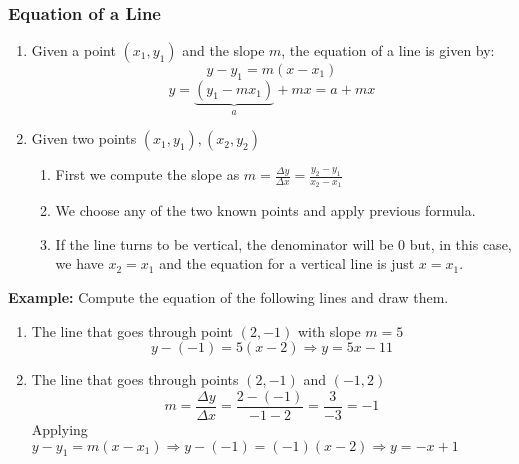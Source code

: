 \documentclass[11pt]{article}
\providecommand{\tightlist}{%
      \setlength{\itemsep}{0pt}\setlength{\parskip}{0pt}}
\begin{document}
    \begin{center}
    \end{center}
    { \hspace*{\fill} \\}
    
    \hypertarget{equation-of-a-line}{%
\subsubsection{Equation of a Line}\label{equation-of-a-line}}

\begin{enumerate}
\def\labelenumi{\arabic{enumi}.}
\item
  Given a point \((x_1, y_1)\) and the slope \(m\), the equation of a
  line is given by: \[
  y - y_1 = m(x - x_1)
  \] \[
  y = \underset{a}{\underbrace{(y_1 - m x_1)}} + m x = a + mx
  \]
\item
  Given two points \((x_1,y_1),(x_2, y_2)\)

  \begin{enumerate}
  \def\labelenumii{\arabic{enumii}.}
  \tightlist
  \item
    First we compute the slope as
    \(m = \frac{\Delta y}{\Delta x} = \frac{y_2 - y_1}{x_2 - x_1}\)
  \item
    We choose any of the two known points and apply previous formula.
  \item
    If the line turns to be vertical, the denominator will be \(0\) but,
    in this case, we have \(x_2 = x_1\) and the equation for a vertical
    line is just \(x = x_1\).
  \end{enumerate}
\end{enumerate}

\textbf{Example:} Compute the equation of the following lines and draw
them.

\begin{enumerate}
\def\labelenumi{\arabic{enumi}.}
\tightlist
\item
  The line that goes through point \((2, -1)\) with slope \(m = 5\) \[
  y - (-1) = 5(x - 2) \Rightarrow y = 5x - 11
  \]
\item
  The line that goes through points \((2, -1)\) and \((-1,2)\) \[
  m = \frac{\Delta y}{\Delta x} = \frac{2-(-1)}{-1-2} = \frac{3}{-3} = -1 
  \] Applying
  \(y - y_1 = m(x - x_1) \Rightarrow y-(-1) = (-1)(x-2) \Rightarrow y = -x + 1\)
\end{enumerate}
\end{document}
